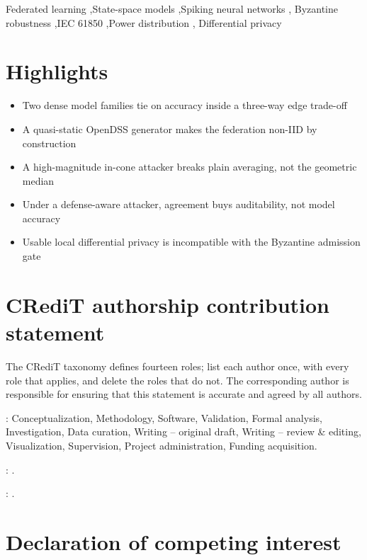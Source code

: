 \documentclass[preprint,11pt]{elsarticle}
\begin{document}
\begin{frontmatter}
\begin{keyword}
Federated learning \sep State-space models \sep Spiking neural networks \sep
Byzantine robustness \sep IEC 61850 \sep Power distribution \sep
Differential privacy
\end{keyword}

\end{frontmatter}

\section*{Highlights}

\begin{itemize}\setlength{\itemsep}{2pt}
\item Two dense model families tie on accuracy inside a three-way edge trade-off
\item A quasi-static OpenDSS generator makes the federation non-IID by construction
\item A high-magnitude in-cone attacker breaks plain averaging, not the geometric median
\item Under a defense-aware attacker, agreement buys auditability, not model accuracy
\item Usable local differential privacy is incompatible with the Byzantine admission gate
\end{itemize}

\section*{CRediT authorship contribution statement}

The CRediT taxonomy defines fourteen roles; list each author once, with every
role that applies, and delete the roles that do not. The corresponding author is
responsible for ensuring that this statement is accurate and agreed by all
authors.

\medskip
\noindent
\textbf{}: Conceptualization, Methodology, Software,
Validation, Formal analysis, Investigation, Data curation, Writing -- original
draft, Writing -- review \& editing, Visualization, Supervision, Project
administration, Funding acquisition.

\medskip
\noindent
\textbf{}: .

\medskip
\noindent
\textbf{}: .

\section*{Declaration of competing interest}
\end{document}
